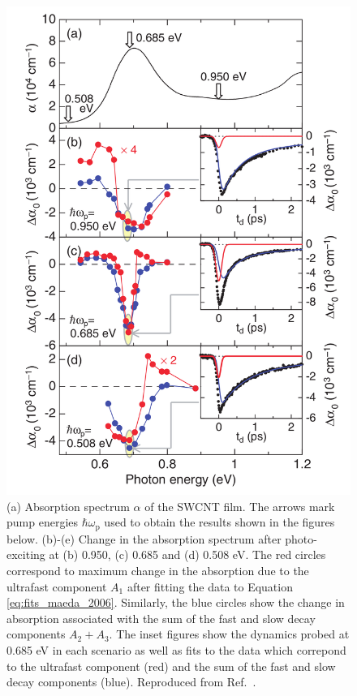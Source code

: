 \begin{figure}[H]
	\centering
	\includegraphics[scale=0.2]{images/chapter_prior_works/dtt_maeda_2006}
	\caption{(a) Absorption spectrum $\alpha$ of the SWCNT film. The arrows mark pump energies $\hbar \omega_\text{p}$ used to obtain the results shown in the figures below. (b)-(e) Change in the absorption spectrum after photo-exciting at (b) 0.950, (c) 0.685 and (d) 0.508 eV. The red circles correspond to maximum change in the absorption due to the ultrafast component $A_1$ after fitting the data to Equation \eqref{eq:fits_maeda_2006}. Similarly, the blue circles show the change in absorption associated with the sum of the fast and slow decay components $A_2 + A_3$. The inset figures show the dynamics probed at 0.685 eV in each scenario as well as fits to the data which correpond to the ultrafast component (red) and the sum of the fast and slow decay components (blue). Reproduced from Ref.\ \cite{maeda2006gigantic}.}
	\label{fig:dtt_maeda_2006}
\end{figure}

